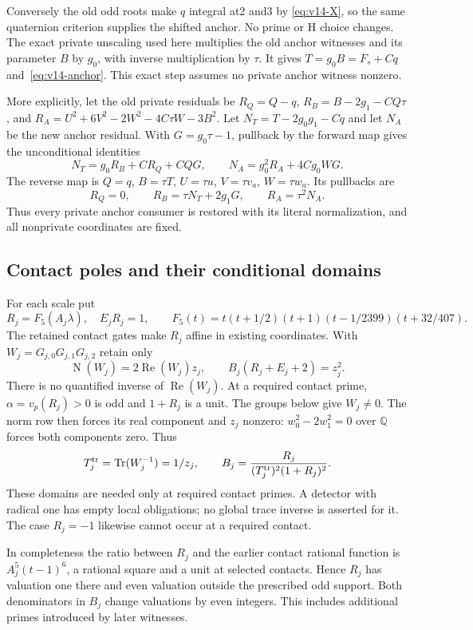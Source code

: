 Conversely the old odd roots make $q$ integral at2 and3 by
\eqref{eq:v14-X}, so the same quaternion criterion supplies the
shifted anchor. No prime or H choice changes. The exact private
unscaling used here multiplies the old anchor witnesses and its
parameter $B$ by $g_0$, with inverse multiplication by $\tau$.
It gives $T=g_0B=F_s+Cq$ and~\eqref{eq:v14-anchor}.
This exact step assumes no private anchor witness nonzero.

More explicitly, let the old private residuals be
$R_Q=Q-q$, $R_B=B-2g_1-CQ\tau$, and
$R_A=U^2+6V^2-2W^2-4C\tau W-3B^2$.
Let $N_T=T-2g_0g_1-Cq$ and let $N_A$ be the new
anchor residual. With $G=g_0\tau-1$, pullback by the
forward map gives the unconditional identities
\[
 N_T=g_0R_B+CR_Q+CQG,\qquad
 N_A=g_0^2R_A+4Cg_0WG.
\]
The reverse map is
$Q=q$, $B=\tau T$, $U=\tau u$, $V=\tau v_a$,
$W=\tau w_a$. Its pullbacks are
\[
 R_Q=0,\qquad R_B=\tau N_T+2g_1G,\qquad R_A=\tau^2N_A.
\]
Thus every private anchor consumer is restored with its
literal normalization, and all nonprivate coordinates are fixed.

\subsection{Contact poles and their conditional domains}\label{subsec:v14-contact}
For each scale put
\[
 R_j=F_5(A_j\lambda),\quad E_jR_j=1,\qquad
 F_5(t)=t(t+1/2)(t+1)(t-1/2399)(t+32/407).
\]
The retained contact gates make $R_j$ affine in existing coordinates.
With $W_j=G_{j,0}G_{j,1}G_{j,2}$ retain only
\begin{equation}\label{eq:v14-pole}
 \operatorname N(W_j)=2\operatorname{Re}(W_j)z_j,\qquad
 B_j(R_j+E_j+2)=z_j^2.
\end{equation}
There is no quantified inverse of $\operatorname{Re}(W_j)$.
At a required contact prime, $\alpha=v_p(R_j)>0$ is odd
and $1+R_j$ is a unit. The groups below give $W_j\ne0$.
The norm row then forces its real component and $z_j$ nonzero:
$w_0^2-2w_1^2=0$ over $\mathbb Q$ forces both components zero.
Thus
\[
 T_j^{\rm tr}=\operatorname{Tr}(W_j^{-1})=1/z_j,\qquad
 B_j=\frac{R_j}{(T_j^{\rm tr})^2(1+R_j)^2}.
\]
These domains are needed only at required contact primes.
A detector with radical one has empty local obligations;
no global trace inverse is asserted for it. The case $R_j=-1$
likewise cannot occur at a required contact.

In completeness the ratio between $R_j$ and the earlier contact
rational function is $A_j^5(t-1)^6$, a rational square and a
unit at selected contacts. Hence $R_j$ has valuation one there
and even valuation outside the prescribed odd support.
Both denominators in $B_j$ change valuations by even integers.
This includes additional primes introduced by later witnesses.

